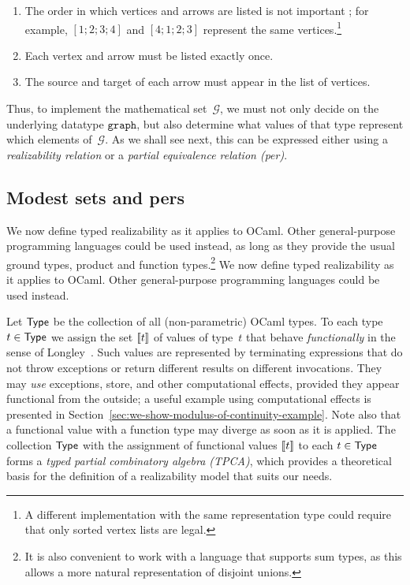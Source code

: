 %
\begin{enumerate}
\item The order in which vertices and arrows are listed is not
  important%
\iflong
; for example, $[1;2;3;4]$ and $[4;1;2;3]$ represent the same vertices.\footnote{
  A different implementation with the same representation type could require
  that only sorted vertex lists are legal.}
\fi %
\item Each vertex and arrow must be listed exactly once.
\item The source and target of each arrow must appear in the list of vertices.
\end{enumerate}
%
Thus, to implement the mathematical set~$\mathcal{G}$, we must not
only decide on the underlying datatype $\mathtt{graph}$, but also
determine what values of that type represent which elements
of~$\mathcal{G}$. As we shall see next, this can be expressed either
using a \emph{realizability relation} or a \emph{partial equivalence
  relation (per)}.


\subsection{Modest sets and pers}
\label{sec:modest-sets-pers}

\iflong
We now define typed realizability as it
applies to OCaml. Other general-purpose programming languages could be
used instead, as long as they provide the usual ground types, product
and function types.\footnote{It is also convenient to work with a
language that supports sum types, as this allows a more natural
representation of disjoint unions.}
\else
We now define typed realizability as it
applies to OCaml. Other general-purpose programming languages could be
used instead.
\fi %

Let $\mathsf{Type}$ be the collection of all (non-parametric) OCaml types. To
each type $t \in \mathsf{Type}$ we assign the set $[\![t]\!]$ of values of
type~$t$ that behave \emph{functionally} in the sense
of Longley~\cite{longley99when}. Such values are represented by terminating
expressions that do not throw exceptions or return different results
on different invocations.  They may \emph{use} exceptions,
store, and other computational effects, provided they appear
functional from the outside; a useful example using computational effects is
presented in Section~\ref{sec:we-show-modulus-of-continuity-example}.
Note also that a functional value with a function type may diverge as
soon as it is applied.   The collection $\mathsf{Type}$ with the assignment of functional
values $[\![t]\!]$ to each $t \in \mathsf{Type}$ forms a \emph{typed partial
  combinatory algebra (TPCA)}, which provides a theoretical basis for
the definition of a realizability model that suits our needs.


